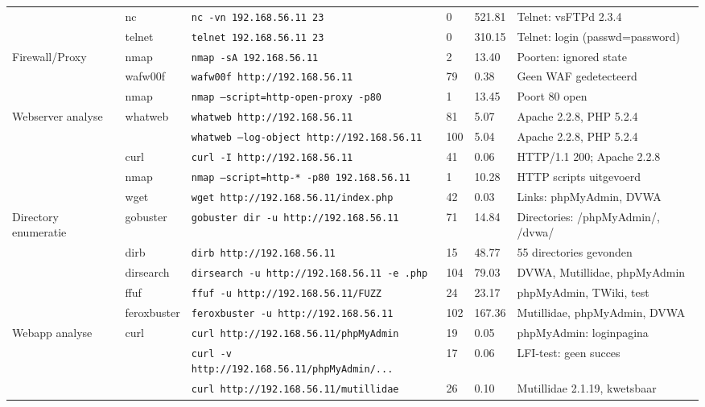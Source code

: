 {\begin{landscape}
\begin{longtable}{lllp{2cm}p{1.2cm}p{4cm}}
 & nc & \texttt{nc -vn 192.168.56.11 23} & 0 & 521.81 & Telnet: vsFTPd 2.3.4 \\
 & telnet & \texttt{telnet 192.168.56.11 23} & 0 & 310.15 & Telnet: login (passwd=password) \\
\multirow{3}{*}{Firewall/Proxy} & nmap & \texttt{nmap -sA 192.168.56.11} & 2 & 13.40 & Poorten: ignored state \\
 & wafw00f & \texttt{wafw00f http://192.168.56.11} & 79 & 0.38 & Geen WAF gedetecteerd \\
 & nmap & \texttt{nmap --script=http-open-proxy -p80} & 1 & 13.45 & Poort 80 open \\
\multirow{5}{*}{Webserver analyse} & \multirow{2}{*}{whatweb} & \texttt{whatweb http://192.168.56.11} & 81 & 5.07 & Apache 2.2.8, PHP 5.2.4 \\
 & & \texttt{whatweb --log-object http://192.168.56.11} & 100 & 5.04 & Apache 2.2.8, PHP 5.2.4 \\
 & curl & \texttt{curl -I http://192.168.56.11} & 41 & 0.06 & HTTP/1.1 200; Apache 2.2.8 \\
 & nmap & \texttt{nmap --script=http-* -p80 192.168.56.11} & 1 & 10.28 & HTTP scripts uitgevoerd \\
 & wget & \texttt{wget http://192.168.56.11/index.php} & 42 & 0.03 & Links: phpMyAdmin, DVWA \\
\multirow{5}{*}{Directory enumeratie} & gobuster & \texttt{gobuster dir -u http://192.168.56.11} & 71 & 14.84 & Directories: /phpMyAdmin/, /dvwa/ \\
 & dirb & \texttt{dirb http://192.168.56.11} & 15 & 48.77 & 55 directories gevonden \\
 & dirsearch & \texttt{dirsearch -u http://192.168.56.11 -e .php} & 104 & 79.03 & DVWA, Mutillidae, phpMyAdmin \\
 & ffuf & \texttt{ffuf -u http://192.168.56.11/FUZZ} & 24 & 23.17 & phpMyAdmin, TWiki, test \\
 & feroxbuster & \texttt{feroxbuster -u http://192.168.56.11} & 102 & 167.36 & Mutillidae, phpMyAdmin, DVWA \\
\multirow{6}{*}{Webapp analyse} & \multirow{5}{*}{curl} & \texttt{curl http://192.168.56.11/phpMyAdmin} & 19 & 0.05 & phpMyAdmin: loginpagina \\
 & & \texttt{curl -v http://192.168.56.11/phpMyAdmin/...} & 17 & 0.06 & LFI-test: geen succes \\
 & & \texttt{curl http://192.168.56.11/mutillidae} & 26 & 0.10 & Mutillidae 2.1.19, kwetsbaar \\

\end{longtable}
\end{landscape}}
